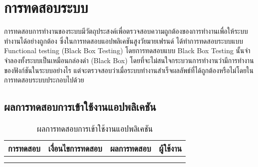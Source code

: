 \chapter{การทดสอบระบบ}
การทดสอบการทำงานของระบบมีวัตถุประสงค์เพื่อตรวจสอบความถูกต้องของการทำงานเพื่อให้ระบบทำงานได้อย่างถูกต้อง ซึ่งในการทดสอบแอปพลิเคชันสูงวัยมายเฟรนด์ ได้ทำการทดสอบระบบแบบ Functional testing (Black Box Testing) โดยการทดสอบแบบ Black Box Testing นั้นจำจำลองทั้งระบบเป็นเหมือนกล่องดำ (Black Box)  โดยที่จะไม่สนใจกระบวนการทำงานว่ามีการทำงานของฟังก์ชันในระบบอย่างไร แต่จะตรวจสอบว่าเมื่อระบบทำงานสำเร็จผลลัพธ์ที่ได้ถูกต้องหรือไม่โดยในการทดสอบระบบประกอบไปด้วย

\section{ผลการทดสอบการเข้าใช้งานแอปพลิเคชัน}
\begin{table}[H]
	\caption{ผลการทดสอบการเข้าใช้งานแอปพลิเคชัน}
    \centering	
	\label{tab:test1}
    \begin{tabular}{ | p{4cm} | p{4cm} | p{4cm} | p{2cm} | }
    \hline
	\multicolumn{1}{|c|}{การทดสอบ} & \multicolumn{1}{c|}{เงื่อนไขการทดสอบ} & \multicolumn{1}{c|}{ผลการทดสอบ} & \multicolumn{1}{c|}{ผู้ใช้งาน}                             \\ \hline
	\setstretch{1.0}{ทดสอบการเข้าใช้งานแอปพลิเคชัน}
	& \setstretch{1.0}{ผู้ใช้งานเข้าใช้งานแอปพลิเคชัน และยังไม่ออกจากระบบ}
	& \setstretch{1.0}{ระบบจะเข้าไปหน้าหลัก} 
	&\setstretch{1.0}{\begin{flushleft}ผู้ใช้งาน\end{flushleft}} \\ \cline{2-3} 
	& \setstretch{1.0}{ผู้ใช้งานเข้าใช้งานแอปพลิเคชัน และออกจากระบบ} 
	& \setstretch{1.0}{ระบบจะเข้าไปหน้าเข้าสู่ระบบ} 
	&\setstretch{1.0}{}\\ \cline{2-3} \hline
    \end{tabular}
\end{table}

